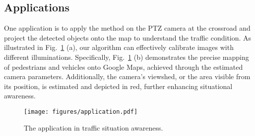 \subsection{Applications}

One application is to apply the method on the PTZ camera at the crossroad and project the detected objects onto the map to understand the traffic condition. As illustrated in Fig.~\ref{fig:application} (a), our algorithm can effectively calibrate images with different illuminations. Specifically, Fig.~\ref{fig:application} (b) demonstrates the precise mapping of pedestrians and vehicles onto Google Maps, achieved through the estimated camera parameters. Additionally, the camera's viewshed, or the area visible from its position, is estimated and depicted in red, further enhancing situational awareness.


\begin{figure}[!t]
    \centering
    \texttt{[image: figures/application.pdf]}
    \caption{The application in traffic situation awareness.}
    \label{fig:application}
\end{figure}
